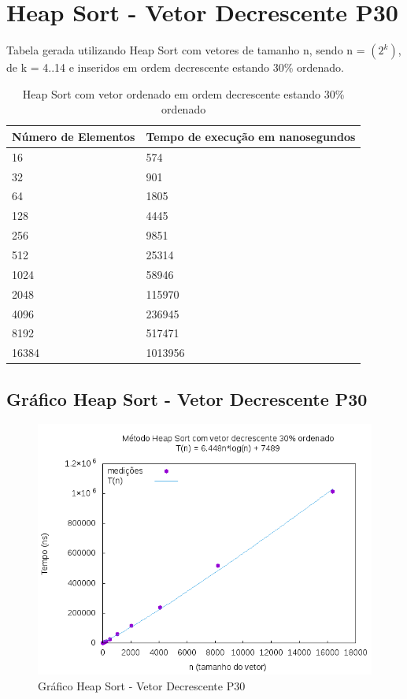 \documentclass[12pt,a4paper,twoside]{report}
\begin{document}
\section{Heap Sort - Vetor Decrescente P30}
Tabela gerada utilizando Heap Sort com vetores de tamanho n, sendo n = $(2^k)$, de k = 4..14 e inseridos em ordem decrescente estando 30\% ordenado.
\begin{table}[H]
\centering
\caption{Heap Sort com vetor ordenado em ordem decrescente estando 30\% ordenado}
\label{my-label}
\begin{tabular}{|l|l|}
\hline
\multicolumn{1}{|c|}{\textbf{Número de Elementos}} & \multicolumn{1}{c|}{\textbf{Tempo de execução em nanosegundos}} \\ \hline
16 & 574 \\ \hline
32 & 901 \\ \hline
64 & 1805 \\ \hline
128 & 4445 \\ \hline
256 & 9851 \\ \hline
512 & 25314 \\ \hline
1024 & 58946 \\ \hline
2048 & 115970 \\ \hline
4096 & 236945 \\ \hline
8192 & 517471 \\ \hline
16384 & 1013956 \\ \hline
\end{tabular}
\end{table}

\subsection{Gráfico Heap Sort - Vetor Decrescente P30}
\begin{figure}[H]
    \centering
    \includegraphics[width=0.7\linewidth]{graficos/HeapSort/vIntDecrescenteP30/vIntDecrescenteP30.png}
  \caption{Gráfico Heap Sort - Vetor Decrescente P30}
\end{figure}
\end{document}
